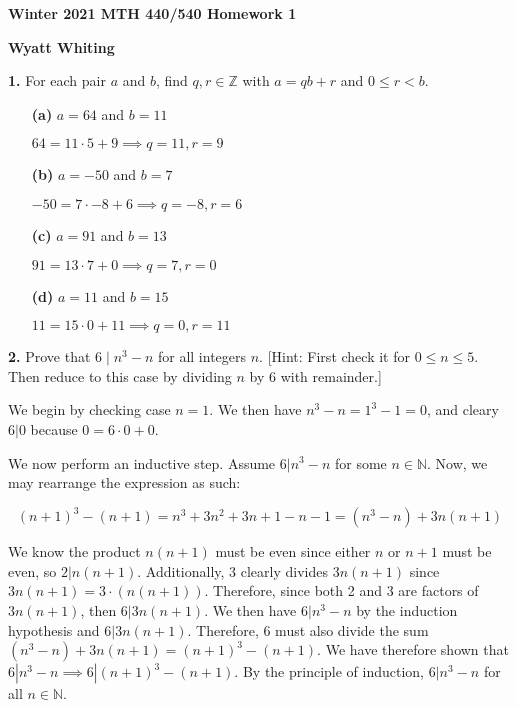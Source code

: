 \documentclass[12pt]{amsart}
\def\ZZ{{\mathbb Z}}
\def\NN{{\mathbb N}}
\begin{document}
{\bf Winter 2021 MTH 440/540 Homework 1}

{\bf Wyatt Whiting}

\medskip


{\bf 1.}  For each pair $a$ and $b$, find $q,r\in\ZZ$ with $a=qb+r$ and $0\leq r<b$.
\begin{itemize}
\item[{\bf (a)}] $a=64$ and $b=11$

$64 = 11 \cdot 5 + 9 \implies q = 11, r = 9$

\item[{\bf (b)}] $a=-50$ and $b=7$

$-50 = 7 \cdot -8 + 6 \implies q = -8, r = 6$

\item[{\bf (c)}] $a=91$ and $b=13$

$91 = 13 \cdot 7 + 0 \implies q = 7, r = 0$

\item[{\bf (d)}] $a=11$ and $b=15$

$11 = 15 \cdot 0 + 11 \implies q = 0, r = 11$

\end{itemize}

\medskip

{\bf 2.}  Prove that $6\mid n^3-n$ for all integers $n$.  [Hint: First check it for $0\leq n\leq 5$. Then reduce to this case by dividing $n$ by $6$ with remainder.]

\bigskip

We begin by checking case $n = 1$. We then have $n^3 - n = 1^3 - 1 = 0$, and cleary $6 | 0$ because $0 = 6 \cdot 0 + 0$.

We now perform an inductive step. Assume $6 | n^3 - n$ for some $n \in \NN$. Now, we may rearrange the expression as such:

\[(n + 1)^3 - (n +1) = n^3 + 3n^2 + 3n + 1 - n - 1 = (n^3 - n) + 3n(n + 1)\]

We know the product $n(n + 1)$ must be even since either $n$ or $n + 1$ must be even, so $2 | n(n + 1)$. Additionally, 3 clearly divides $3n(n + 1)$ since $3n(n + 1) = 3 \cdot (n (n + 1))$. Therefore, since both 2 and 3 are factors of $3n(n + 1)$, then $6 | 3n(n + 1)$. We then have $6 | n^3 - n$ by the induction hypothesis and $6 | 3n(n + 1)$. Therefore, 6 must also divide the sum $(n^3 - n) + 3n(n + 1) = (n + 1)^3 - (n + 1)$. We have therefore shown that $6 | n^3 - n \implies 6 | (n + 1)^3 - (n + 1)$. By the principle of induction, $6 | n^3 - n$ for all $ n \in \NN$.  
\end{document}
